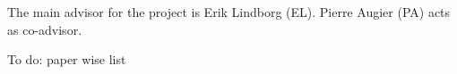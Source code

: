%
\begin{divisionofwork}
	The main advisor for the project is Erik Lindborg (EL).
	Pierre Augier (PA) acts as co-advisor.

        To do: paper wise list

\end{divisionofwork}


%
%
%


%
%
%


%
\tableofcontents
